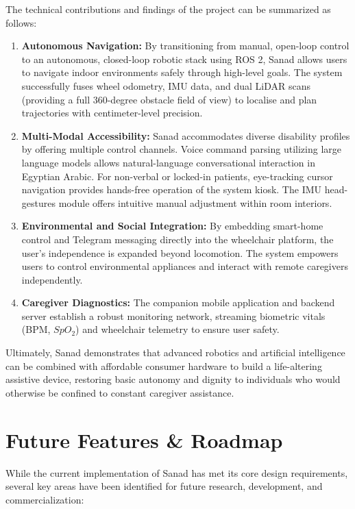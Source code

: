 The technical contributions and findings of the project can be summarized as follows:
\begin{enumerate}
    \item \textbf{Autonomous Navigation:} By transitioning from manual, open-loop control to an autonomous, closed-loop robotic stack using ROS 2, Sanad allows users to navigate indoor environments safely through high-level goals. The system successfully fuses wheel odometry, IMU data, and dual LiDAR scans (providing a full 360-degree obstacle field of view) to localise and plan trajectories with centimeter-level precision.
    \item \textbf{Multi-Modal Accessibility:} Sanad accommodates diverse disability profiles by offering multiple control channels. Voice command parsing utilizing large language models allows natural-language conversational interaction in Egyptian Arabic. For non-verbal or locked-in patients, eye-tracking cursor navigation provides hands-free operation of the system kiosk. The IMU head-gestures module offers intuitive manual adjustment within room interiors.
    \item \textbf{Environmental and Social Integration:} By embedding smart-home control and Telegram messaging directly into the wheelchair platform, the user's independence is expanded beyond locomotion. The system empowers users to control environmental appliances and interact with remote caregivers independently.
    \item \textbf{Caregiver Diagnostics:} The companion mobile application and backend server establish a robust monitoring network, streaming biometric vitals (BPM, $SpO_2$) and wheelchair telemetry to ensure user safety.
\end{enumerate}

Ultimately, Sanad demonstrates that advanced robotics and artificial intelligence can be combined with affordable consumer hardware to build a life-altering assistive device, restoring basic autonomy and dignity to individuals who would otherwise be confined to constant caregiver assistance.

\section{Future Features \& Roadmap}

While the current implementation of Sanad has met its core design requirements, several key areas have been identified for future research, development, and commercialization:


